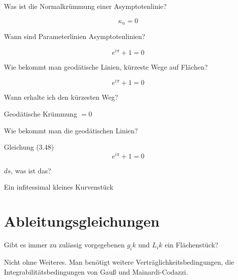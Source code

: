 \documentclass[twocolumn, fontsize=8pt, DIV=1]{scrartcl}
\begin{document}
\begin{framed}
    Was ist die Normalkrümmung einer Asymptotenlinie?
\end{framed}
\[
    \kappa_n = 0
\]



\begin{framed}
    Wann sind Parameterlinien Asymptotenlinien?
\end{framed}
\[
    e^{i\pi} + 1 = 0
\]



\begin{framed}
    Wie bekommt man geodätische Linien, kürzeste Wege auf Flächen?
\end{framed}
\[
    e^{i\pi} + 1 = 0
\]



\begin{framed}
    Wann erhalte ich den kürzesten Weg?
\end{framed}
Geodätische Krümmung $= 0$



\begin{framed}
    Wie bekommt man die geodätischen Linien?
\end{framed}
Gleichung (3.48)
\[
    e^{i\pi} + 1 = 0
\]



\begin{framed}
    $ds$, was ist das?
\end{framed}
Ein infitessimal kleines Kurvenstück











\section{Ableitungsgleichungen}


\begin{framed}
    Gibt es immer zu zulässig vorgegebenen $g_ik$ und $L_ik$ ein Flächenstück?
\end{framed}
Nicht ohne Weiteres. Man benötigt weitere Verträglichkeitsbedingungen, die Integrabilitätsbedingungen von Gauß und Mainardi-Codazzi.
\end{document}

